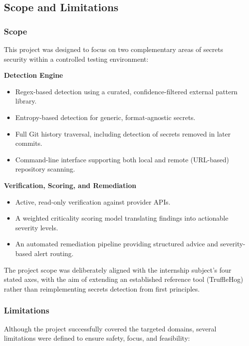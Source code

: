 \documentclass[12pt]{article}
\begin{document}
\subsection{Scope and Limitations}

\subsubsection*{Scope}

This project was designed to focus on two complementary areas of secrets
security within a controlled testing environment:

\textbf{Detection Engine}

\begin{itemize}
    \item Regex-based detection using a curated, confidence-filtered external pattern library.
    \item Entropy-based detection for generic, format-agnostic secrets.
    \item Full Git history traversal, including detection of secrets removed in later commits.
    \item Command-line interface supporting both local and remote (URL-based) repository scanning.
\end{itemize}

\textbf{Verification, Scoring, and Remediation}

\begin{itemize}
    \item Active, read-only verification against provider APIs.
    \item A weighted criticality scoring model translating findings into actionable severity levels.
    \item An automated remediation pipeline providing structured advice and severity-based alert routing.
\end{itemize}

The project scope was deliberately aligned with the internship subject's four
stated axes, with the aim of extending an established reference tool
(TruffleHog) rather than reimplementing secrets detection from first
principles.

\subsubsection*{Limitations}

Although the project successfully covered the targeted domains, several
limitations were defined to ensure safety, focus, and feasibility:
\end{document}
